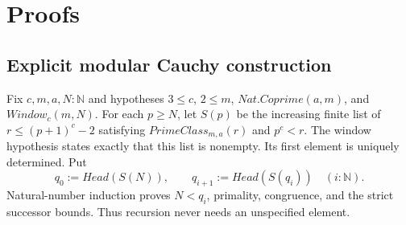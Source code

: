 \documentclass[11pt,reqno]{amsart}
\makeatletter
\newcommand{\N}{\mathbb N}
\theoremstyle{blueplain}
\newcounter{type}
\newcommand{\defref}[1]{\hyperref[#1]{Definition~\ref*{#1}}}
\numberwithin{equation}{section}
\DeclareRobustCommand{\defref}[1]{%
  \hyperlink{def:#1}{\ensuremath{\csname PredicateName@#1\endcsname}}}
\def\defref#1{#1}%
\def\hyperlink#1#2{#2}}
\makeatother
\begin{document}
\section{Proofs}\label{sec:proofs}

\subsection*{Explicit modular Cauchy construction}\label{sec:typed-cauchy-proof}
Fix $c,m,a,N:\N$ and hypotheses
$3\le c$, $2\le m$, $\defref{Nat.Coprime}(a,m)$,
and $\defref{Window}_c(m,N)$. For each $p\ge N$, let $S(p)$ be the
increasing finite list of $r\le(p+1)^c-2$ satisfying
$\defref{PrimeClass}_{m,a}(r)$ and $p^c<r$.
The window hypothesis states exactly that this list is nonempty.
Its first element is uniquely determined. Put
\[
q_0:=\defref{Head}(S(N)),\qquad
q_{i+1}:=\defref{Head}(S(q_i))\quad(i:\N).
\]
Natural-number induction proves $N<q_i$, primality, congruence, and the
strict successor bounds. Thus recursion never needs an unspecified element.
\end{document}
